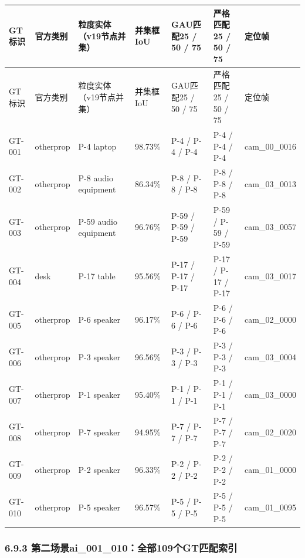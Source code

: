 \documentclass[UTF8,fontset=fandol]{ctexart}
\begin{document}
{\small
\begin{longtable}{|p{}|p{}|p{}|p{}|p{}|p{}|p{}|}
\hline
GT标识 & 官方类别 & 粒度实体（v19节点并集） & 并集框IoU & GAU匹配25 / 50 / 75 & 严格匹配25 / 50 / 75 & 定位帧 \\ \hline
\endfirsthead
\hline
GT标识 & 官方类别 & 粒度实体（v19节点并集） & 并集框IoU & GAU匹配25 / 50 / 75 & 严格匹配25 / 50 / 75 & 定位帧 \\ \hline
\endhead
GT-001 & otherprop & P-4 laptop & 98.73\% & P-4 / P-4 / P-4 & P-4 / P-4 / P-4 & cam\_00\_0016 \\ \hline
GT-002 & otherprop & P-8 audio equipment & 86.34\% & P-8 / P-8 / P-8 & P-8 / P-8 / P-8 & cam\_03\_0013 \\ \hline
GT-003 & otherprop & P-59 audio equipment & 96.76\% & P-59 / P-59 / P-59 & P-59 / P-59 / P-59 & cam\_03\_0057 \\ \hline
GT-004 & desk & P-17 table & 95.56\% & P-17 / P-17 / P-17 & P-17 / P-17 / P-17 & cam\_03\_0017 \\ \hline
GT-005 & otherprop & P-6 speaker & 96.17\% & P-6 / P-6 / P-6 & P-6 / P-6 / P-6 & cam\_02\_0000 \\ \hline
GT-006 & otherprop & P-3 speaker & 96.56\% & P-3 / P-3 / P-3 & P-3 / P-3 / P-3 & cam\_03\_0004 \\ \hline
GT-007 & otherprop & P-1 speaker & 95.40\% & P-1 / P-1 / P-1 & P-1 / P-1 / P-1 & cam\_03\_0000 \\ \hline
GT-008 & otherprop & P-7 speaker & 94.95\% & P-7 / P-7 / P-7 & P-7 / P-7 / P-7 & cam\_02\_0020 \\ \hline
GT-009 & otherprop & P-2 speaker & 96.33\% & P-2 / P-2 / P-2 & P-2 / P-2 / P-2 & cam\_01\_0000 \\ \hline
GT-010 & otherprop & P-5 speaker & 96.57\% & P-5 / P-5 / P-5 & P-5 / P-5 / P-5 & cam\_01\_0095 \\ \hline
\end{longtable}
}

\subsubsection*{6.9.3 第二场景ai\_001\_010：全部109个GT匹配索引}
\end{document}
